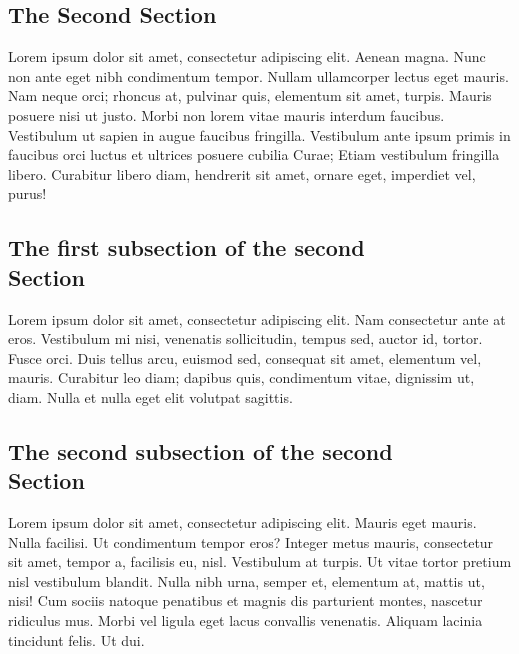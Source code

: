 \documentclass[a4paper,10pt]{article}
\begin{document}
\begin{multicols}{2}
\section{The Second Section}

Lorem ipsum dolor sit amet, consectetur adipiscing elit.  Aenean magna. Nunc non
ante eget nibh condimentum tempor. Nullam ullamcorper lectus eget mauris. Nam
neque orci; rhoncus at, pulvinar quis, elementum sit amet, turpis. Mauris
posuere nisi ut justo. Morbi non lorem vitae mauris interdum faucibus.
Vestibulum ut sapien in augue faucibus fringilla. Vestibulum ante ipsum primis
in faucibus orci luctus et ultrices posuere cubilia Curae; Etiam vestibulum
fringilla libero. Curabitur libero diam, hendrerit sit amet, ornare eget,
imperdiet vel, purus!


\subsection{The first subsection of the second \\ Section}

Lorem ipsum dolor sit amet, consectetur adipiscing elit. Nam consectetur ante at
eros. Vestibulum mi nisi, venenatis sollicitudin, tempus sed, auctor id, tortor.
Fusce orci. Duis tellus arcu, euismod sed, consequat sit amet, elementum vel,
mauris. Curabitur leo diam; dapibus quis, condimentum vitae, dignissim ut, diam.
Nulla et nulla eget elit volutpat sagittis.

\subsection{The second subsection of the second \\ Section}

Lorem ipsum dolor sit amet, consectetur adipiscing elit. Mauris eget mauris.
Nulla facilisi. Ut condimentum tempor eros? Integer metus mauris, consectetur
sit amet, tempor a, facilisis eu, nisl. Vestibulum at turpis. Ut vitae tortor
pretium nisl vestibulum blandit. Nulla nibh urna, semper et, elementum at,
mattis ut, nisi! Cum sociis natoque penatibus et magnis dis parturient montes,
nascetur ridiculus mus. Morbi vel ligula eget lacus convallis venenatis. Aliquam
lacinia tincidunt felis. Ut dui.




\end{multicols}
\end{document}
